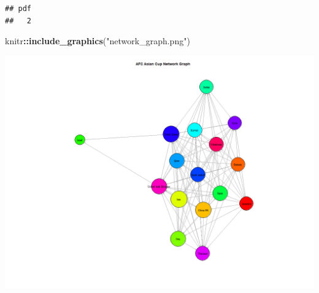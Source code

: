\documentclass[
]{article}
\newenvironment{Shaded}{\begin{snugshade}}{\end{snugshade}}
\newcommand{\FunctionTok}[1]{\textcolor[rgb]{0.13,0.29,0.53}{\textbf{#1}}}
\newcommand{\NormalTok}[1]{#1}
\newcommand{\SpecialCharTok}[1]{\textcolor[rgb]{0.81,0.36,0.00}{\textbf{#1}}}
\newcommand{\StringTok}[1]{\textcolor[rgb]{0.31,0.60,0.02}{#1}}
\begin{document}
\begin{verbatim}
## pdf 
##   2
\end{verbatim}

\begin{Shaded}
\begin{Highlighting}[]
\NormalTok{knitr}\SpecialCharTok{::}\FunctionTok{include\_graphics}\NormalTok{(}\StringTok{"network\_graph.png"}\NormalTok{)}
\end{Highlighting}
\end{Shaded}

\includegraphics[width=11.11in]{network_graph}
\end{document}
